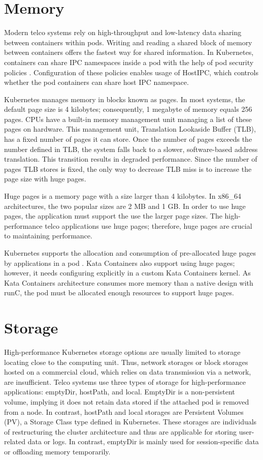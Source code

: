 \section{Memory}

Modern telco systems rely on high-throughput and low-latency data sharing between containers within pods. Writing and reading a shared block of memory between containers offers the fastest way for shared information. In Kubernetes, containers can share IPC namespaces inside a pod with the help of pod security policies \cite{PodSecurityPolicyKubernetes}. Configuration of these policies enables usage of HostIPC, which controls whether the pod containers can share host IPC namespace.

Kubernetes manages memory in blocks known as pages. In most systems, the default page size is 4 kilobytes; consequently, 1 megabyte of memory equals 256 pages. CPUs have a built-in memory management unit managing a list of these pages on hardware. This management unit, Translation Lookaside Buffer (TLB), has a fixed number of pages it can store. Once the number of pages exceeds the number defined in TLB, the system falls back to a slower, software-based address translation. This transition results in degraded performance. Since the number of pages TLB stores is fixed, the only way to decrease TLB miss is to increase the page size with huge pages. \cite{HugePagesOpenShift}

Huge pages is a memory page with a size larger than 4 kilobytes. In x86\_64 architectures, the two popular sizes are 2 MB and 1 GB. In order to use huge pages, the application must support the use the larger page sizes. The high-performance telco applications use huge pages; therefore, huge pages are crucial to maintaining performance.

Kubernetes supports the allocation and consumption of pre-allocated huge pages by applications in a pod \cite{HugePagesKubernetes}. Kata Containers also support using huge pages; however, it needs configuring explicitly in a custom Kata Containers kernel. As Kata Containers architecture consumes more memory than a native design with runC, the pod must be allocated enough resources to support huge pages.

\section{Storage}

High-performance Kubernetes storage options are usually limited to storage locating close to the computing unit. Thus, network storages or block storages hosted on a commercial cloud, which relies on data transmission via a network, are insufficient. Telco systems use three types of storage for high-performance applications: emptyDir, hostPath, and local. EmptyDir is a non-persistent volume, implying it does not retain data stored if the attached pod is removed from a node. In contrast, hostPath and local storages are Persistent Volumes (PV), a Storage Class type defined in Kubernetes. These storages are individuals of restructuring the cluster architecture and thus are applicable for storing user-related data or logs. In contrast, emptyDir is mainly used for session-specific data or offloading memory temporarily.

